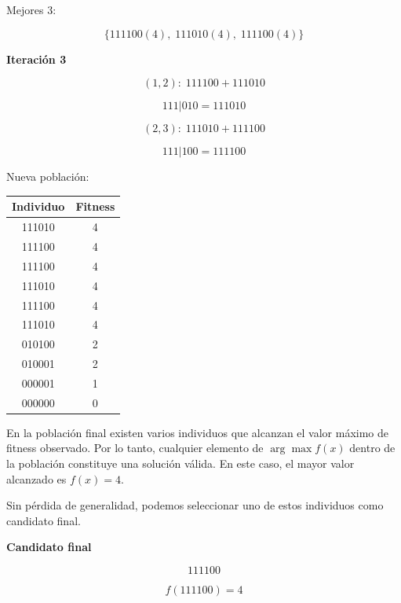 Mejores 3:

\[
\{111100(4),\;111010(4),\;111100(4)\}
\]

\bigskip
\textbf{Iteración 3}

\[
(1,2):\;111100 + 111010
\]

\[
111|010 = 111010
\]

\[
(2,3):\;111010 + 111100
\]

\[
111|100 = 111100
\]

Nueva población:

\begin{center}
\begin{tabular}{c|c}
Individuo & Fitness \\
\hline
111010 & 4 \\
111100 & 4 \\
111100 & 4 \\
111010 & 4 \\
111100 & 4 \\
111010 & 4 \\
010100 & 2 \\
010001 & 2 \\
000001 & 1 \\
000000 & 0 \\
\end{tabular}
\end{center}

\bigskip
En la población final existen varios individuos que alcanzan el valor máximo de fitness observado. 
Por lo tanto, cualquier elemento de $\arg\max f(x)$ dentro de la población constituye una solución válida. 
En este caso, el mayor valor alcanzado es $f(x)=4$.

Sin pérdida de generalidad, podemos seleccionar uno de estos individuos como candidato final.

\textbf{Candidato final}

\[
\boxed{111100}
\]

\[
f(111100)=4
\]
